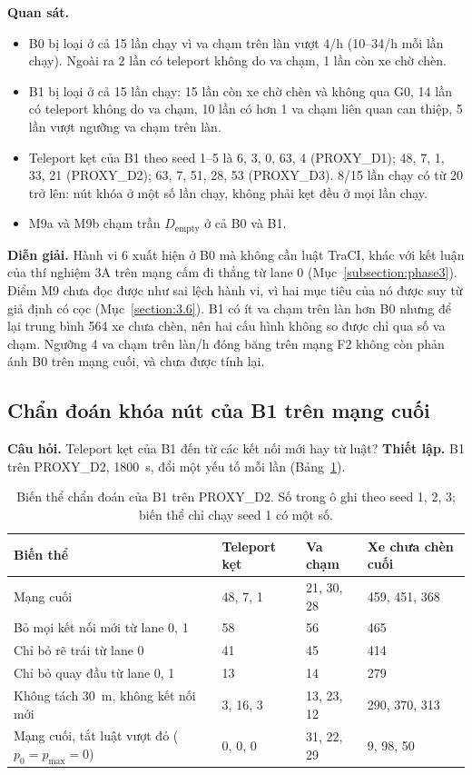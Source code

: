 \documentclass[../DoAn.tex]{subfiles}
\begin{document}
\textbf{Quan sát.}
\begin{itemize}
    \item B0 bị loại ở cả 15 lần chạy vì va chạm trên làn vượt 4/h (10--34/h mỗi lần chạy). Ngoài ra 2 lần có teleport không do va chạm, 1 lần còn xe chờ chèn.
    \item B1 bị loại ở cả 15 lần chạy: 15 lần còn xe chờ chèn và không qua G0, 14 lần có teleport không do va chạm, 10 lần có hơn 1 va chạm liên quan can thiệp, 5 lần vượt ngưỡng va chạm trên làn.
    \item Teleport kẹt của B1 theo seed 1--5 là 6, 3, 0, 63, 4 (PROXY\_D1); 48, 7, 1, 33, 21 (PROXY\_D2); 63, 7, 51, 28, 53 (PROXY\_D3). 8/15 lần chạy có từ 20 trở lên: nút khóa ở một số lần chạy, không phải kẹt đều ở mọi lần chạy.
    \item M9a và M9b chạm trần $D_{\text{empty}}$ ở cả B0 và B1.
\end{itemize}

\textbf{Diễn giải.} Hành vi 6 xuất hiện ở B0 mà không cần luật TraCI, khác với kết luận của thí nghiệm 3A trên mạng cấm đi thẳng từ lane 0 (Mục~\ref{subsection:phase3}). Điểm M9 chưa đọc được như sai lệch hành vi, vì hai mục tiêu của nó được suy từ giả định có cọc (Mục~\ref{section:3.6}). B1 có ít va chạm trên làn hơn B0 nhưng để lại trung bình 564 xe chưa chèn, nên hai cấu hình không so được chỉ qua số va chạm. Ngưỡng 4 va chạm trên làn/h đóng băng trên mạng F2 không còn phản ánh B0 trên mạng cuối, và chưa được tính lại.

\subsection{Chẩn đoán khóa nút của B1 trên mạng cuối}
\label{subsection:gridlock}

\textbf{Câu hỏi.} Teleport kẹt của B1 đến từ các kết nối mới hay từ luật? \textbf{Thiết lập.} B1 trên PROXY\_D2, 1800~s, đổi một yếu tố mỗi lần (Bảng~\ref{table:4.gridlock}).

\begin{table}[H]
\centering
\small
\caption{Biến thể chẩn đoán của B1 trên PROXY\_D2. Số trong ô ghi theo seed 1, 2, 3; biến thể chỉ chạy seed 1 có một số.}
\label{table:4.gridlock}
\begin{tabular}{|p{6.4cm}|p{2.2cm}|p{2.2cm}|p{2.4cm}|}
\hline
\textbf{Biến thể} & \textbf{Teleport kẹt} & \textbf{Va chạm} & \textbf{Xe chưa chèn cuối} \\ \hline
Mạng cuối & 48, 7, 1 & 21, 30, 28 & 459, 451, 368 \\ \hline
Bỏ mọi kết nối mới từ lane 0, 1 & 58 & 56 & 465 \\ \hline
Chỉ bỏ rẽ trái từ lane 0 & 41 & 45 & 414 \\ \hline
Chỉ bỏ quay đầu từ lane 0, 1 & 13 & 14 & 279 \\ \hline
Không tách 30~m, không kết nối mới & 3, 16, 3 & 13, 23, 12 & 290, 370, 313 \\ \hline
Mạng cuối, tắt luật vượt đỏ ($p_0 = p_{\max} = 0$) & 0, 0, 0 & 31, 22, 29 & 9, 98, 50 \\ \hline
\end{tabular}
\end{table}
\end{document}
